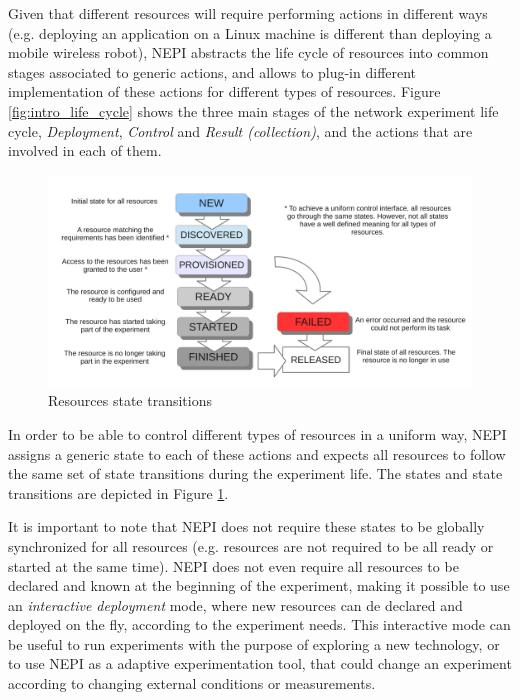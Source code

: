 Given that different resources will require performing actions in 
different ways (e.g. deploying an application on 
a Linux machine is different than deploying a mobile wireless robot), 
NEPI abstracts the life cycle of resources into common stages associated
to generic actions, and allows to plug-in different implementation of 
these actions for different types of resources.
Figure \ref{fig:intro_life_cycle} shows the three
main stages of the network experiment life cycle, \emph{Deployment}, 
\emph{Control} and \emph{Result (collection)}, and the actions that are 
involved in each of them. 

\begin{figure}[h]
  \centering
  \includegraphics[width=\textwidth]{intro_state_transitions}
  \caption{Resources state transitions}
  \label{fig:intro_state_transitions}
\end{figure}

In order to be able to control different types of resources in 
a uniform way, NEPI assigns a generic state to each of these
actions and expects all resources to follow the same set of
state transitions during the experiment life. The states and
state transitions are depicted in Figure 
\ref{fig:intro_state_transitions}.

It is important to note that NEPI does not require these states
to be globally synchronized for all resources (e.g. resources
are not required to be all ready or started at the same time).
NEPI does not even require all resources to be declared and known 
at the beginning of the experiment, making it possible to use 
an \emph{interactive deployment} mode, where new resources can de 
declared and deployed on the fly, according to the experiment needs.
This interactive mode can be useful to run experiments with the 
purpose of exploring a new technology, or to use NEPI as a adaptive
experimentation tool, that could change an experiment according to
changing external conditions or measurements. 

